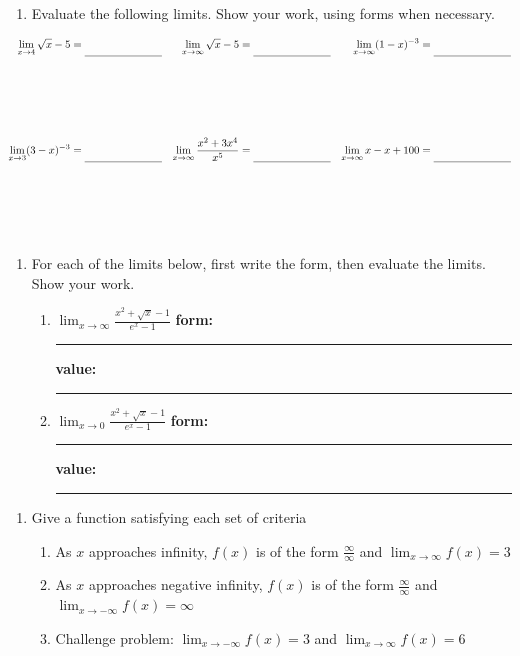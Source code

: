 \documentclass[10pt]{article}
\begin{document}
\pagestyle{otherpages}
\thispagestyle{firstpage}


\begin{enumerate}
\item[1.] Evaluate the following limits. Show your work, using forms when necessary.
\end{enumerate}

\begin{align*}
\lim_{x \rightarrow 4} \sqrt{x} - 5 &=\rule[-8pt]{1in}{0.4pt} & \lim_{x \rightarrow \infty} \sqrt{x} - 5 &=\rule[-8pt]{1in}{0.4pt} & \lim_{x \rightarrow \infty} (1-x)^{-3} &=\rule[-8pt]{1in}{0.4pt}\\[1in]
%
\lim_{x \rightarrow 3} (3-x)^{-3} &=\rule[-8pt]{1in}{0.4pt} & \lim_{x \rightarrow \infty} \frac{x^2 + 3x^4}{x^5} &=\rule[-8pt]{1in}{0.4pt} & \lim_{x \rightarrow \infty} x - x + 100 &=\rule[-8pt]{1in}{0.4pt}\\[1in]
\end{align*} 




\begin{enumerate}
\item[2.]\reversemarginpar{} For each of the limits below, first write the form, then evaluate the limits. Show your work.
    \begin{enumerate}
    \item[(a)] $\displaystyle\lim_{x\to\infty}\frac{x^2+\sqrt{x}-1}{e^x-1}$ \hfill {\bf form:}\rule[-8pt]{0.5in}{0.4pt} \hfill {\bf value:}\rule[-8pt]{0.5in}{0.4pt}
        \vfill

    \item[(b)] $\displaystyle\lim_{x\to0}\frac{x^2+\sqrt{x}-1}{e^x-1}$ \hfill {\bf form:}\rule[-8pt]{0.5in}{0.4pt} \hfill {\bf value:}\rule[-8pt]{0.5in}{0.4pt}
        \vfill
    \end{enumerate}
\end{enumerate}

\begin{enumerate}
\item[3.]\reversemarginpar{} Give a function satisfying each set of criteria
    \begin{enumerate}
    \item[(a)] As $x$ approaches infinity, $f(x)$ is of the form $\frac \infty \infty$ and $\lim_{x\to \infty}f(x) = 3$
        \vfill

    \item[(b)] As $x$ approaches negative infinity, $f(x)$ is of the form $\frac \infty \infty$ and $\lim_{x\to -\infty}f(x) = \infty$ 
        \vfill

    \item[(c)] Challenge problem: $\lim_{x\to -\infty}f(x) = 3$ and $\lim_{x\to \infty}f(x) = 6$ 
        \vfill
    \end{enumerate}
\end{enumerate}
\end{document}
